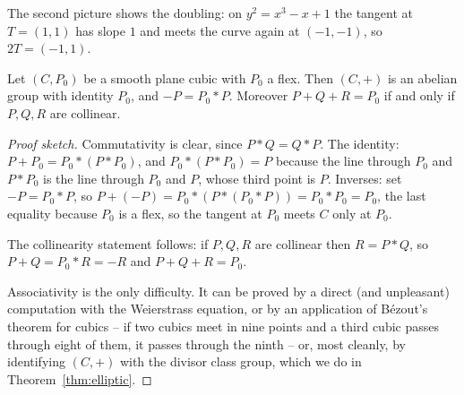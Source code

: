 \begin{center}
\end{center}

The second picture shows the doubling: on $y^2 = x^3-x+1$ the tangent at $T = (1,1)$ has slope $1$ and meets the curve again at $(-1,-1)$, so $2T = (-1,1)$.

\begin{theorem}\label{thm:grouplaw}
	Let $(C,P_0)$ be a smooth plane cubic with $P_0$ a flex. Then $(C,+)$ is an abelian group with identity $P_0$, and $-P = P_0 * P$. Moreover $P + Q + R = P_0$ if and only if $P, Q, R$ are collinear.
\end{theorem}

\begin{proof}[Proof sketch]
	Commutativity is clear, since $P*Q = Q*P$. The identity: $P + P_0 = P_0*(P*P_0)$, and $P_0 * (P*P_0) = P$ because the line through $P_0$ and $P*P_0$ is the line through $P_0$ and $P$, whose third point is $P$. Inverses: set $-P = P_0*P$, so $P + (-P) = P_0*(P * (P_0*P)) = P_0 * P_0 = P_0$, the last equality because $P_0$ is a flex, so the tangent at $P_0$ meets $C$ only at $P_0$.

	The collinearity statement follows: if $P,Q,R$ are collinear then $R = P*Q$, so $P+Q = P_0*R = -R$ and $P+Q+R = P_0$.

	Associativity is the only difficulty. It can be proved by a direct (and unpleasant) computation with the Weierstrass equation, or by an application of B\'ezout's theorem for cubics -- if two cubics meet in nine points and a third cubic passes through eight of them, it passes through the ninth -- or, most cleanly, by identifying $(C,+)$ with the divisor class group, which we do in Theorem~\ref{thm:elliptic}.
\end{proof}

